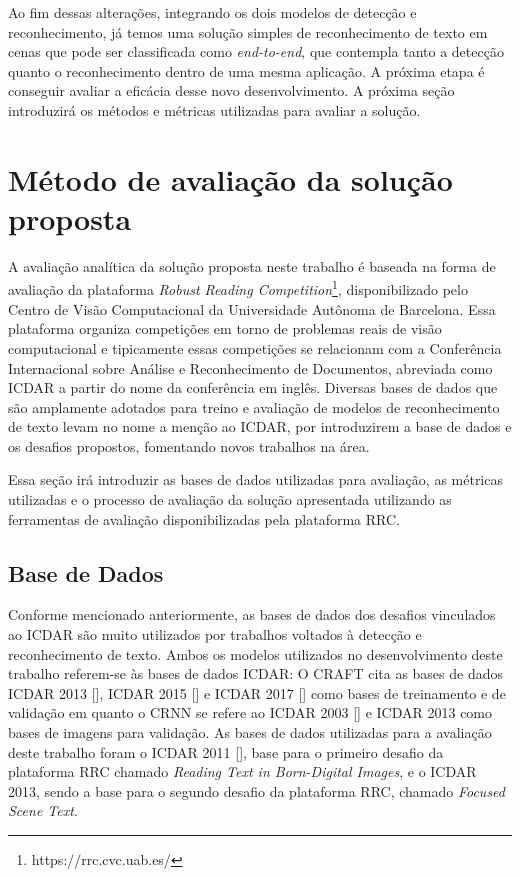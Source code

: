 Ao fim dessas alterações, integrando os dois modelos de detecção e reconhecimento, já temos uma solução simples de reconhecimento de texto em cenas 
que pode ser classificada como \textit{end-to-end}, que contempla tanto a detecção quanto o reconhecimento dentro de uma mesma aplicação. A próxima 
etapa é conseguir avaliar a eficácia desse novo desenvolvimento. A próxima seção introduzirá os métodos e métricas utilizadas para avaliar a solução.

\section{Método de avaliação da solução proposta}\label{sec:methodology_validation}

A avaliação analítica da solução proposta neste trabalho é baseada na forma de avaliação da plataforma \textit{Robust Reading Competition}\footnote{https://rrc.cvc.uab.es/}, 
disponibilizado pelo Centro de Visão Computacional da Universidade Autônoma de Barcelona. Essa plataforma organiza competições em torno de 
problemas reais de visão computacional e tipicamente essas competições se relacionam com a Conferência Internacional sobre Análise e Reconhecimento 
de Documentos, abreviada como ICDAR a partir do nome da conferência em inglês. Diversas bases de dados que são amplamente adotados para 
treino e avaliação de modelos de reconhecimento de texto levam no nome a menção ao ICDAR, por introduzirem a base de dados e os desafios 
propostos, fomentando novos trabalhos na área.

Essa seção irá introduzir as bases de dados utilizadas para avaliação, as métricas utilizadas e o processo de avaliação da solução apresentada 
utilizando as ferramentas de avaliação disponibilizadas pela plataforma RRC.

\subsection{Base de Dados}\label{sec:methodology_datasets}

Conforme mencionado anteriormente, as bases de dados dos desafios vinculados ao ICDAR são muito utilizados por trabalhos voltados à detecção e 
reconhecimento de texto. Ambos os modelos utilizados no desenvolvimento deste trabalho referem-se às bases de dados ICDAR: O CRAFT cita as bases 
de dados ICDAR 2013 [], ICDAR 2015 [] e ICDAR 2017 [] como bases de treinamento 
e de validação em quanto o CRNN se refere ao ICDAR 2003 [] e ICDAR 2013 como bases de imagens para validação. As bases de 
dados utilizadas para a avaliação deste trabalho foram o ICDAR 2011 [], base para o primeiro desafio da plataforma RRC 
chamado \textit{Reading Text in Born-Digital Images}, e o ICDAR 2013, sendo a base para o segundo desafio da plataforma RRC, chamado \textit{Focused Scene Text}.

